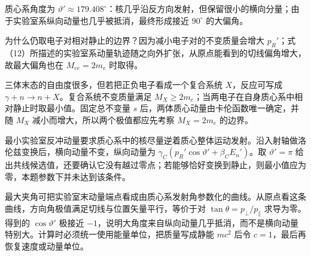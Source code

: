 \documentclass[12pt,a4paper,UTF8]{ctexart}
\begin{document}
质心系角度为
\(\vartheta'\approx179.408^\circ\)：核几乎沿反方向发射，但保留很小的横向分量；由于实验室系纵向动量也几乎被抵消，最终形成接近
\(90^\circ\) 的大偏角。

为什么仍取电子对相对静止的边界？因为减小电子对的不变质量会增大
\(p_R'\)；式（12）所描述的实验室系动量轨迹随之向外扩张，从原点能看到的切线偏角增大，故最大偏角也在
\(M_{ee}=2m_e\) 时取得。

三体末态的自由度很多，但若把正负电子看成一个复合系统 \(X\)，反应可写成
\(\gamma+n\to n+X\)。复合系统不变质量满足
\(M_X\geqslant2m_e\)；当两电子在自身质心系中相对静止时取最小值。固定总不变量
\(s\) 后，两体质心动量由卡伦函数唯一确定，并随 \(M_X\)
减小而增大，所以两个极值都应先考察 \(M_X=2m_e\) 的边界。

最小实验室反冲动量要求质心系中的核尽量逆着质心整体运动发射。沿入射轴做洛伦兹变换后，横向动量不变，纵向动量为
\(\gamma_C(p_R'\cos\vartheta'+\beta_CE_n')\)。取 \(\vartheta'=\pi\)
给出共线候选值，还要确认它没有越过零点；若能够恰好变换到静止，则最小值应为零，本题参数下并未达到该条件。

最大夹角可把实验室末动量端点看成由质心系发射角参数化的曲线。从原点看这条曲线，方向角极值满足切线与位置矢量平行，等价于对
\(\tan\theta=p_\perp/p_\parallel\) 求导为零。得到的 \(\cos\vartheta'\)
极接近
\(-1\)，说明大角度来自纵向动量几乎抵消，而不是横向动量特别大。计算时必须统一使用能量单位，把质量写成静能
\(mc^2\) 后令 \(c=1\)，最后再恢复速度或动量单位。
\end{document}
